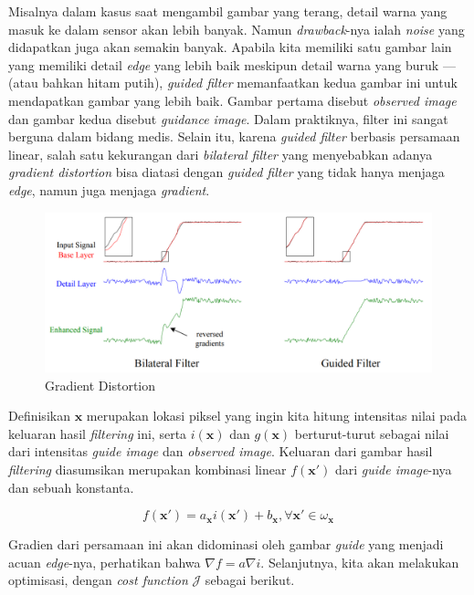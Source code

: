 \documentclass[11pt, a4paper, final]{report}
\begin{document}
Misalnya dalam kasus saat mengambil gambar yang terang, detail warna yang masuk ke dalam sensor akan lebih banyak. Namun \textit{drawback}-nya ialah \textit{noise} yang didapatkan juga akan semakin banyak. Apabila kita memiliki satu gambar lain yang memiliki detail \textit{edge} yang lebih baik meskipun detail warna yang buruk --- (atau bahkan hitam putih), \textit{guided filter} memanfaatkan kedua gambar ini untuk mendapatkan gambar yang lebih baik. Gambar pertama disebut \textit{observed image} dan gambar kedua disebut \textit{guidance image}. Dalam praktiknya, filter ini sangat berguna dalam bidang medis. Selain itu, karena \textit{guided filter} berbasis persamaan linear, salah satu kekurangan dari \textit{bilateral filter} yang menyebabkan adanya \textit{gradient distortion} bisa diatasi dengan \textit{guided filter} yang tidak hanya menjaga \textit{edge}, namun juga menjaga \textit{gradient}.

\begin{figure}[H]
\centering
\includegraphics[scale=0.3]{assets/GradientDistortion.png}
\caption{Gradient Distortion \cite{he2015fast}}
\end{figure}

Definisikan $\bm{x}$ merupakan lokasi piksel yang ingin kita hitung intensitas nilai pada keluaran hasil \textit{filtering} ini, serta $i(\bm{x})$ dan $g(\bm{x})$ berturut-turut sebagai nilai dari intensitas \textit{guide image} dan \textit{observed image}. Keluaran dari gambar hasil \textit{filtering} diasumsikan merupakan kombinasi linear $f(\bm{x}')$ dari \textit{guide image}-nya dan sebuah konstanta.

$$
f(\bm{x}') = a_{\bm{x}} i(\bm{x}') + b_{\bm{x}}, \forall \bm{x}' \in \omega_{\bm{x}}
$$

Gradien dari persamaan ini akan didominasi oleh gambar \textit{guide} yang menjadi acuan \textit{edge}-nya, perhatikan bahwa $\nabla f = a \nabla i$. Selanjutnya, kita akan melakukan optimisasi, dengan \textit{cost function} $\mathcal{J}$ sebagai berikut.
\end{document}
